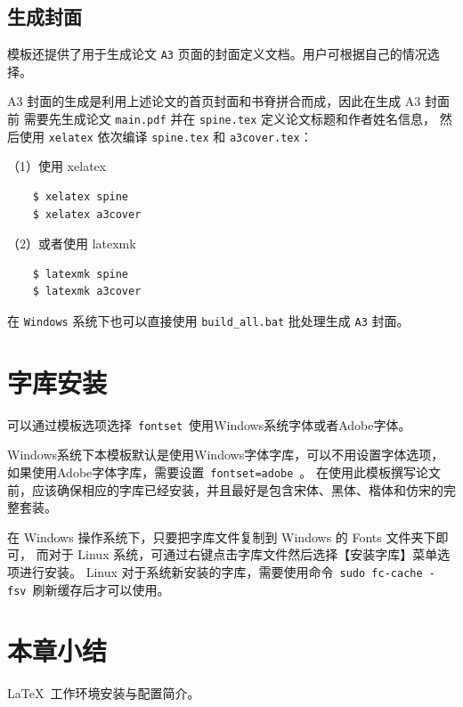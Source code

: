 \subsection{生成封面}

模板还提供了用于生成论文 \texttt{A3} 页面的封面定义文档。用户可根据自己的情况选择。

A3 封面的生成是利用上述论文的首页封面和书脊拼合而成，因此在生成 A3 封面前
需要先生成论文 \texttt{main.pdf} 并在 \texttt{spine.tex} 定义论文标题和作者姓名信息，
然后使用 \texttt{xelatex} 依次编译 \texttt{spine.tex} 和 \texttt{a3cover.tex}：

（1）使用 xelatex

\begin{lstlisting}
    $ xelatex spine
    $ xelatex a3cover
\end{lstlisting}

（2）或者使用 latexmk

\begin{lstlisting}
    $ latexmk spine
    $ latexmk a3cover
\end{lstlisting}

在 \texttt{Windows} 系统下也可以直接使用 \texttt{build\_all.bat} 批处理生成 \texttt{A3} 封面。

\section{字库安装}

可以通过模板选项选择~\texttt{fontset}~使用Windows系统字体或者Adobe字体。

Windows系统下本模板默认是使用Windows字体字库，可以不用设置字体选项，如果使用Adobe字体字库，需要设置~\texttt{fontset=adobe}~。
在使用此模板撰写论文前，应该确保相应的字库已经安装，并且最好是包含宋体、黑体、楷体和仿宋的完整套装。

在 Windows 操作系统下，只要把字库文件复制到 Windows 的 Fonts 文件夹下即可，
而对于 Linux 系统，可通过右键点击字库文件然后选择【安装字库】菜单选项进行安装。
Linux 对于系统新安装的字库，需要使用命令~\texttt{sudo fc-cache -fsv}~刷新缓存后才可以使用。

\section{本章小结}
\LaTeX{}~工作环境安装与配置简介。
